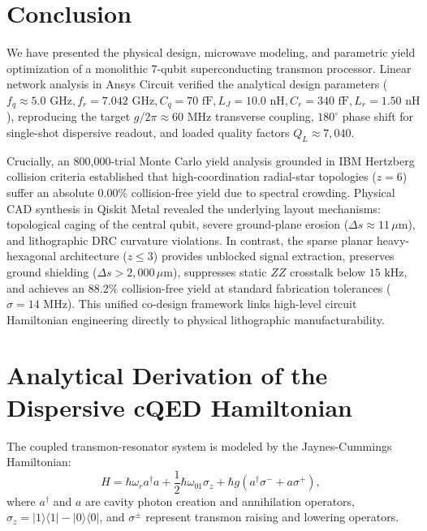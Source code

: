 \documentclass[10pt,journal,compsoc]{IEEEtran}
\begin{document}
\section{Conclusion}
We have presented the physical design, microwave modeling, and parametric yield optimization of a monolithic 7-qubit superconducting transmon processor. Linear network analysis in Ansys Circuit verified the analytical design parameters ($f_q \approx 5.0\text{ GHz}, f_r = 7.042\text{ GHz}, C_q = 70\text{ fF}, L_J = 10.0\text{ nH}, C_r = 340\text{ fF}, L_r = 1.50\text{ nH}$), reproducing the target $g/2\pi \approx 60\text{ MHz}$ transverse coupling, $180^\circ$ phase shift for single-shot dispersive readout, and loaded quality factors $Q_L \approx 7{,}040$.

Crucially, an 800,000-trial Monte Carlo yield analysis grounded in IBM Hertzberg collision criteria established that high-coordination radial-star topologies ($z = 6$) suffer an absolute $0.00\%$ collision-free yield due to spectral crowding. Physical CAD synthesis in Qiskit Metal revealed the underlying layout mechanisms: topological caging of the central qubit, severe ground-plane erosion ($\Delta s \approx 11\,\mu\text{m}$), and lithographic DRC curvature violations. In contrast, the sparse planar heavy-hexagonal architecture ($z \le 3$) provides unblocked signal extraction, preserves ground shielding ($\Delta s > 2{,}000\,\mu\text{m}$), suppresses static $ZZ$ crosstalk below $15\text{ kHz}$, and achieves an $88.2\%$ collision-free yield at standard fabrication tolerances ($\sigma = 14\text{ MHz}$). This unified co-design framework links high-level circuit Hamiltonian engineering directly to physical lithographic manufacturability.

\appendices

\section{Analytical Derivation of the Dispersive cQED Hamiltonian}
The coupled transmon-resonator system is modeled by the Jaynes-Cummings Hamiltonian:
\begin{equation}
H = \hbar \omega_r a^\dagger a + \frac{1}{2}\hbar \omega_{01} \sigma_z + \hbar g (a^\dagger \sigma^- + a \sigma^+),
\end{equation}
where $a^\dagger$ and $a$ are cavity photon creation and annihilation operators, $\sigma_z = |1\rangle\langle 1| - |0\rangle\langle 0|$, and $\sigma^\pm$ represent transmon raising and lowering operators.
\end{document}
